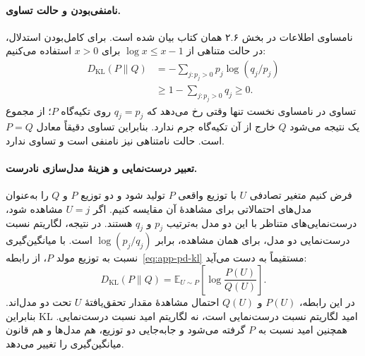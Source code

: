 \paragraph{نامنفی‌بودن و حالت تساوی.}
نامساوی اطلاعات در بخش ۲.۶ همان کتاب \cite{CoverThomas2006} بیان شده است. برای کامل‌بودن استدلال، در حالت متناهی از $\log x\le x-1$ برای $x>0$ استفاده می‌کنیم:
\begin{equation}\label{eq:app-pd-kl-nonnegative}
\begin{aligned}
D_{\mathrm{KL}}(P\|Q)
&=-\sum_{j:p_j>0}p_j\log(q_j/p_j)\\
&\ge 1-\sum_{j:p_j>0}q_j\ge0.
\end{aligned}
\end{equation}
تساوی در نامساوی نخست تنها وقتی رخ می‌دهد که $q_j=p_j$ روی تکیه‌گاه $P$؛ از مجموع یک نتیجه می‌شود $Q$ خارج از آن تکیه‌گاه جرم ندارد. بنابراین تساوی دقیقاً معادل $P=Q$ است. حالت نامتناهی نیز نامنفی است و تساوی ندارد.

\paragraph{تعبیر درست‌نمایی و هزینهٔ مدل‌سازی نادرست.}
فرض کنیم متغیر تصادفی $U$ با توزیع واقعی $P$ تولید شود و دو توزیع $P$ و $Q$ را به‌عنوان مدل‌های احتمالاتی برای مشاهدهٔ آن مقایسه کنیم. اگر $U=j$ مشاهده شود، درست‌نمایی‌های متناظر با این دو مدل به‌ترتیب $p_j$ و $q_j$ هستند. در نتیجه، لگاریتم نسبت درست‌نمایی دو مدل، برای همان مشاهده، برابر $\log(p_j/q_j)$ است. با میانگین‌گیری نسبت به توزیع مولد $P$، از رابطه~\eqref{eq:app-pd-kl} مستقیماً به دست می‌آید:
\begin{equation}\label{eq:app-pd-kl-likelihood-ratio}
\boxed{
D_{\mathrm{KL}}(P\|Q)
=\mathbb E_{U\sim P}\left[\log\frac{P(U)}{Q(U)}\right].
}
\end{equation}
در این رابطه، $P(U)$ و $Q(U)$ احتمال مشاهدهٔ مقدار تحقق‌یافتهٔ $U$ تحت دو مدل‌اند. بنابراین KL امید لگاریتم نسبت درست‌نمایی است، نه لگاریتم امید نسبت درست‌نمایی. همچنین امید نسبت به $P$ گرفته می‌شود و جابه‌جایی دو توزیع، هم مدل‌ها و هم قانون میانگین‌گیری را تغییر می‌دهد.

